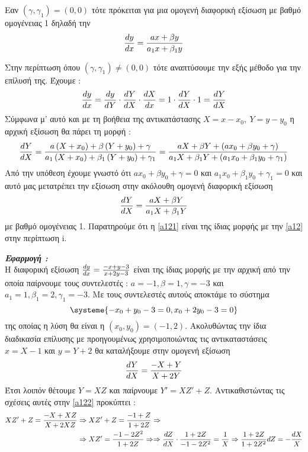\documentclass[a4paper,twoside,11pt]{book}
\DeclareRobustCommand{\frac}[3][0pt]{%
{\begingroup\hspace{#1}#2\hspace{#1}\endgroup\over\hspace{#1}#3\hspace{#1}}}
\begin{document}
\begin{rlist}
\item Εαν $ (\gamma,\gamma_1)=(0,0) $ τότε πρόκειται για μια ομογενή διαφορική εξίσωση με βαθμό ομογένειας 1 δηλαδή την 
\begin{equation}\label{a12}
\frac{dy}{dx}=
\frac{ax+\beta y}{a_1x+\beta_1 y}
\end{equation} 
\item Στην περίπτωση όπου $ (\gamma,\gamma_1)\neq(0,0) $ τότε αναπτύσουμε την εξής μέθοδο για την επίλυσή της. Έχουμε :
\[ \frac{dy}{dx}=\frac{dy}{dY}\cdot\frac{dY}{dX}\cdot\frac{dX}{dx}=1\cdot\frac{dY}{dX}\cdot1=\frac{dY}{dX} \]
Σύμφωνα μ' αυτό και με τη βοήθεια της αντικατάστασης $ X=x-x_0,\ Y=y-y_0 $ η αρχική εξίσωση θα πάρει τη μορφή :
\[ \frac{dY}{dX}=\frac{a\left(X+x_0\right) +\beta \left(Y+y_0\right)+\gamma}{a_1\left(X+x_0\right)+\beta_1\left(Y+y_0\right)+\gamma_1}=
\frac{aX+\beta Y+(ax_0+\beta y_0+\gamma)}{a_1X+\beta_1 Y+(a_1x_0+\beta_1 y_0+\gamma_1)} \]
Από την υπόθεση έχουμε γνωστό ότι $ ax_0+\beta y_0+\gamma=0 $ και $ a_1x_0+\beta_1 y_0+\gamma_1=0 $ και αυτό μας μετατρέπει την εξίσωση στην ακόλουθη ομογενή διαφορική εξίσωση 
\begin{equation}\label{a121}
\frac{dY}{dX}=
\frac{aX+\beta Y}{a_1X+\beta_1 Y}
\end{equation}
με βαθμό ομογένειας 1. Παρατηρούμε ότι η \eqref{a121} είναι της ίδιας μορφής με την \eqref{a12} στην περίπτωση i.
\end{rlist}
\textit{\textbf{Εφαρμογή : }}\\
Η διαφορική εξίσωση $ \frac{dy}{dx}=\frac{-x+y-3}{x+2y-3} $ είναι της ίδιας μορφής με την αρχική από την οποία παίρνουμε τους συντελεστές : $ a=-1, \beta=1, \gamma=-3 $ και $ a_1=1, \beta_1=2, \gamma_1=-3 $. Με τους συντελεστές αυτούς αποκτάμε το σύστημα
\[ \systeme{-x_0+y_0-3=0,x_0+2y_0-3=0} \]
της οποίας η λύση θα είναι η $ (x_0,y_0)=(-1,2) $. Ακολυθώντας την ίδια διαδικασία επίλυσης με προηγουμένως χρησιμοποιώντας τις αντικαταστάσεις $ x=X-1 $ και $ y=Y+2 $ θα καταλήξουμε στην ομογενή εξίσωση 
\begin{equation}\label{a122}
\frac{dY}{dX}=
\frac{-X+Y}{X+2Y}
\end{equation}
Έτσι λοιπόν θέτουμε $ Y=XZ $ και παίρνουμε $ Y'=XZ'+Z $. Αντικαθιστώντας τις σχέσεις αυτές στην \eqref{a122} προκύπτει :
\begin{align*}
XZ'+Z=\frac{-X+XZ}{X+2XZ}&\Rightarrow XZ'+Z=\frac{-1+Z}{1+2Z}\Rightarrow\\
&\Rightarrow XZ'=\frac{-1-2Z^2}{1+2Z}\Rightarrow
\Rightarrow\frac{dZ}{dX}\cdot\frac{1+2Z}{-1-2Z^2}=\frac{1}{X}\Rightarrow \frac{1+2Z}{1+2Z^2}dZ=-\frac{dX}{X}
\end{align*}
\end{document}
